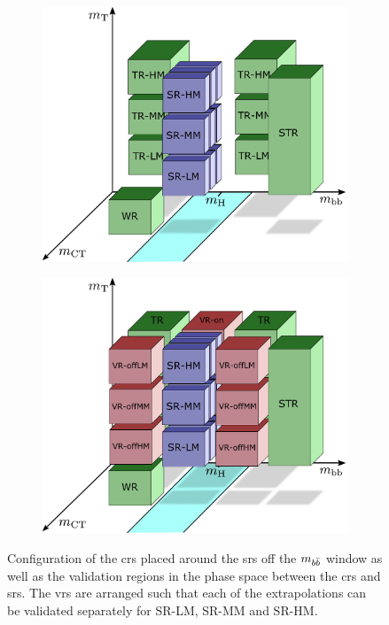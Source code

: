 \begin{figure}[t]
	\centering
	\begin{subfigure}[b]{0.45\linewidth}
		\centering\includegraphics[width=1.0\textwidth]{strategy_5}
		\caption{\label{fig:cr_strategy}}
	\end{subfigure}\hfill
	\begin{subfigure}[b]{0.45\linewidth}
		\centering\includegraphics[width=1.0\textwidth]{strategy_7}
		\caption{\label{fig:vr_strategy}}
	\end{subfigure}\hfill

	\caption{Configuration of  the \glspl{cr} placed around the \glspl{sr} off the $m_{b\bar{b}}$ window as well as  the validation regions in the phase space between the \glspl{cr} and \glspl{sr}. The \glspl{vr} are arranged such that each of the extrapolations can be validated separately for SR-LM, SR-MM and SR-HM.}
	\label{fig:results_HF_scans}
\end{figure}

